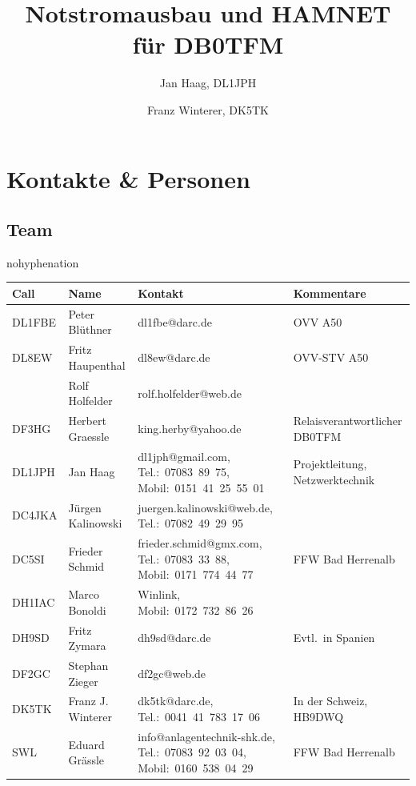 \documentclass[a4paper]{scrartcl}
\author{Jan Haag, DL1JPH \and Franz Winterer, DK5TK}
\date{\gitAuthorDate}
\title{Notstromausbau und HAMNET f\"ur DB0TFM}
\begin{document}
\maketitle
\tableofcontents

\section{Kontakte \& Personen}

\subsection{Team}
\begin{sloppypar}
\begin{hyphenrules}{nohyphenation}
\begin{longtabu} to \linewidth {llXX}
Call & Name & Kontakt & Kommentare\\
\toprule
\endhead
DL1FBE  & Peter Bl\"uthner      & dl1fbe@darc.de                                                            & OVV A50\\
\midrule
DL8EW   & Fritz Haupenthal      & dl8ew@darc.de                                                             & OVV-STV A50\\
\midrule
        & Rolf Holfelder        & rolf.holfelder@web.de                                                     & \\
\midrule
DF3HG   & Herbert Graessle      & king.herby@yahoo.de                                                       & Relaisverantwortlicher DB0TFM\\
\midrule
DL1JPH  & Jan Haag              & dl1jph@gmail.com, Tel.:~07083~89~75, Mobil:~0151~41~25~55~01              & Projektleitung, Netzwerktechnik\\
\midrule
DC4JKA  & J\"urgen Kalinowski   & juergen.kalinowski@web.de, Tel.:~07082~49~29~95                           & \\
\midrule
DC5SI   & Frieder Schmid        & frieder.schmid@gmx.com, Tel.:~07083~33~88, Mobil:~0171~774~44~77          & FFW Bad Herrenalb\\
\midrule
DH1IAC  & Marco Bonoldi         & Winlink, Mobil:~0172~732~86~26                                            & \\
\midrule
DH9SD   & Fritz Zymara          & dh9sd@darc.de                                                             & Evtl.\ in Spanien\\
\midrule
DF2GC   & Stephan Zieger        & df2gc@web.de                                                              & \\
\midrule
DK5TK   & Franz J. Winterer     & dk5tk@darc.de, Tel.:~0041~41~783~17~06                                    & In der Schweiz, HB9DWQ \\
\midrule
SWL     & Eduard Gr\"assle      & info@anlagentechnik-shk.de, Tel.:~07083~92~03~04, Mobil:~0160~538~04~29   & FFW Bad Herrenalb\\
\bottomrule
\end{longtabu}
\end{hyphenrules}
\end{sloppypar}
\end{document}
